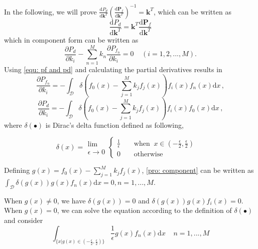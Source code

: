In the following, we will prove $ \frac{\mathrm{d}P_d}{\mathrm{d}\mathbf{k}^T}(
\frac{\mathrm{d}\mathbf{P}_f}{\mathrm{d}\mathbf{k}^T}
)^{-1} = \mathbf{k}^T
$, which can be written as
\begin{equation}
\label{pro: vec}
\frac{\mathrm{d}P_d}{\mathrm{d}\mathbf{k}^T} = \mathbf{k}^T \frac{\mathrm{d}\mathbf{P}_f}{\mathrm{d}\mathbf{k}^T}
\end{equation}
which in component form can be written as 
\begin{equation}
\label{pro: component}
\frac{\partial P_d}{\partial k_i} - \sum_{n=1}^{M}k_n\frac{\partial P_{f_n}}{\partial k_i} = 0 \;\;\;\;(i=1, 2, ..., M).
\end{equation}
Using \eqref{equ: pf and pd} and calculating the  partial derivatives results in
\begin{equation}
\label{pro: Pf par k}
\frac{\partial P_{f_n}}{ \partial k_i} = - \int_{\mathcal{D}}\delta (f_0(x) - \sum_{j=1}^{M}k_jf_j(x))f_i(x)f_n(x) \mathrm{d}x\,,
\end{equation}
\label{pro: Pd par k}
\begin{equation}\frac{\partial P_d}{ \partial k_i} = - \int_{\mathcal{D}}\delta (f_0(x) - \sum_{j=1}^{M}k_jf_j(x))f_i(x)f_0(x) \mathrm{d}x\,,
\end{equation}
where $\delta(\bullet)$ is Dirac's delta function defined as following,

\begin{equation}
\label{pro: delta}
\delta(x) = \substack{\lim \\ \epsilon \rightarrow 0} \begin{cases}
\frac{1}{\epsilon}\;\;\;\;&\text{when} \;\;x \in (-\frac{\epsilon}{2}, \frac{\epsilon}{2})\\
0\;\;\;\;&\text{otherwise}
\end{cases} \;\;\;\;
\end{equation}

Defining $g(x) = f_0(x) - \sum_{j=1}^{M} k_jf_j(x)$, \eqref{pro: component} can be written as $\int_{\mathcal{D}}\delta(g(x))g(x)f_n(x)\mathrm{d}x = 0, n = 1, ..., M$.

When $g(x) \neq 0$, we have $\delta(g(x)) = 0$ and $\delta(g(x))g(x)f_i(x) = 0$.   When  $g(x) = 0$, we can solve the equation according to the definition of $\delta(\bullet)$ and consider
\begin{equation}
\label{pro: important}
\int_{\{x|g(x)\in (-\frac{\epsilon}{2}, \frac{\epsilon}{2})\}} \frac{1}{\epsilon} g(x)f_n(x) \mathrm{d}x\;\;\;\;n= 1, ..., M
\end{equation}

